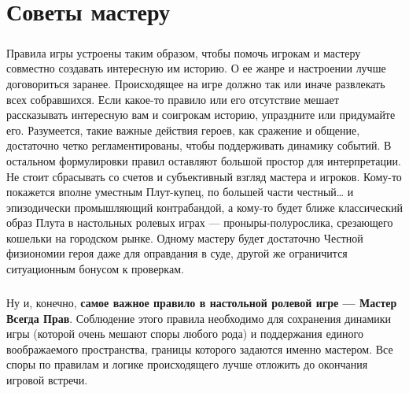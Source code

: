 \chapter{Советы мастеру}
\paragraph{}
Правила игры устроены таким образом, чтобы помочь игрокам и мастеру совместно создавать интересную им историю. О ее жанре и настроении лучше договориться заранее. Происходящее на игре должно так или иначе развлекать всех собравшихся. Если какое-то правило или его отсутствие мешает рассказывать интересную вам и соигрокам историю, упраздните или придумайте его. Разумеется, такие важные действия героев, как сражение и общение, достаточно четко регламентированы, чтобы поддерживать динамику событий. В остальном формулировки правил оставляют большой простор для интерпретации. Не стоит сбрасывать со счетов и субъективный взгляд мастера и игроков. Кому-то покажется вполне уместным Плут-купец, по большей части честный… и эпизодически промышляющий контрабандой, а кому-то будет ближе классический образ Плута в настольных ролевых играх — проныры-полурослика, срезающего кошельки на городском рынке. Одному мастеру будет достаточно Честной физиономии героя даже для оправдания в суде, другой же ограничится ситуационным бонусом к проверкам.
\paragraph{}
Ну и, конечно, \textbf{самое важное правило в настольной ролевой игре — Мастер Всегда Прав}. Соблюдение этого правила необходимо для сохранения динамики игры (которой очень мешают споры любого рода) и поддержания единого воображаемого пространства, границы которого задаются именно мастером. Все споры по правилам и логике происходящего лучше отложить до окончания игровой встречи.




